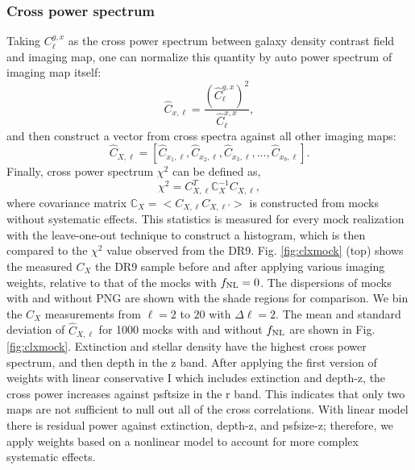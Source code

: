 \subsubsection{Cross power spectrum}
Taking $C^{g,x}_{\ell}$ as the cross power spectrum between galaxy density contrast field and imaging map, one can normalize this quantity by auto power spectrum of imaging map itself:
\begin{equation}
\hat{C}_{x, \ell} = \frac{(\hat{C}^{g,x}_{\ell})^{2}}{\hat{C}^{x,x}_{\ell}},
\end{equation}
and then construct a vector from cross spectra against all other imaging maps:
\begin{equation}
\hat{C}_{X, \ell} = [\hat{C}_{x_{1}, \ell}, \hat{C}_{x_{2}, \ell}, \hat{C}_{x_{3}, \ell}, ..., \hat{C}_{x_{9}, \ell}].
\end{equation}
Finally, cross power spectrum $\chi^{2}$ can be defined as,
\begin{equation}
\chi^{2} = C^{T}_{X, \ell} \mathbb{C}_{X}^{-1} C_{X, \ell},
\end{equation}
where covariance matrix $\mathbb{C}_{X} = < C_{X, \ell} C_{X, \ell'} >$ is constructed from mocks without systematic effects. This statistics is measured for every mock realization with the leave-one-out technique to construct a histogram, which is then compared to the $\chi^{2}$ value observed from the DR9.  Fig. \ref{fig:clxmock} (top) shows the measured $C_{X}$ the DR9 sample before and after applying various imaging weights, relative to that of the mocks with $f_{\rm NL}=0$. The dispersions of mocks with and without PNG are shown with the shade regions for comparison. We bin the $C_{X}$ measurements from $\ell=2$ to $20$ with $\Delta\ell=2$. The mean and standard deviation of $\hat{C}_{X, \ell}$ for 1000 mocks with and without $f_{\rm NL}$ are shown in Fig. \ref{fig:clxmock}.  Extinction and stellar density have the highest cross power spectrum, and then depth in the z band. After applying the first version of weights with linear conservative I which includes extinction and depth-z, the cross power increases against psftsize in the r band. This indicates that only two maps are not sufficient to null out all of the cross correlations. With linear model there is residual power against extinction, depth-z, and psfsize-z; therefore, we apply weights based on a nonlinear model to account for more complex systematic effects. 

